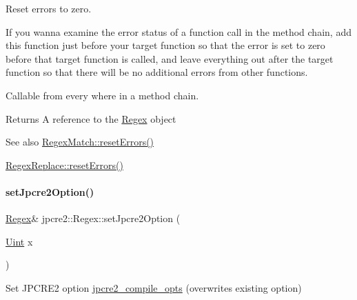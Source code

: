 Reset errors to zero. 

If you wanna examine the error status of a function call in the method chain, add this function just before your target function so that the error is set to zero before that target function is called, and leave everything out after the target function so that there will be no additional errors from other functions.

Callable from every where in a method chain. \begin{DoxyReturn}{Returns}
A reference to the \hyperlink{classjpcre2_1_1Regex}{Regex} object 
\end{DoxyReturn}
\begin{DoxySeeAlso}{See also}
\hyperlink{classjpcre2_1_1RegexMatch_aa19512638f2f5389384d6b9ad01c70c0_aa19512638f2f5389384d6b9ad01c70c0}{Regex\+Match\+::reset\+Errors()} 

\hyperlink{classjpcre2_1_1RegexReplace_a1d708fe8f948d260a8e033cff7898f9c_a1d708fe8f948d260a8e033cff7898f9c}{Regex\+Replace\+::reset\+Errors()} 
\end{DoxySeeAlso}
\hypertarget{classjpcre2_1_1Regex_a031617a19638ef752dcd2b29fa3464d5_a031617a19638ef752dcd2b29fa3464d5}{}\label{classjpcre2_1_1Regex_a031617a19638ef752dcd2b29fa3464d5_a031617a19638ef752dcd2b29fa3464d5} 
\paragraph{\texorpdfstring{set\+Jpcre2\+Option()}{setJpcre2Option()}}
{\footnotesize\ttfamily \hyperlink{classjpcre2_1_1Regex}{Regex}\& jpcre2\+::\+Regex\+::set\+Jpcre2\+Option (\begin{DoxyParamCaption}\item[{\hyperlink{namespacejpcre2_a078242d38221a13fb3543b9edd78c099}{Uint}}]{x }\end{DoxyParamCaption})\hspace{0.3cm}{\ttfamily [inline]}}



Set J\+P\+C\+R\+E2 option \hyperlink{classjpcre2_1_1Regex_abdd26c3bc1c3132f0aa73dde1690a7ef}{jpcre2\+\_\+compile\+\_\+opts} (overwrites existing option) 


